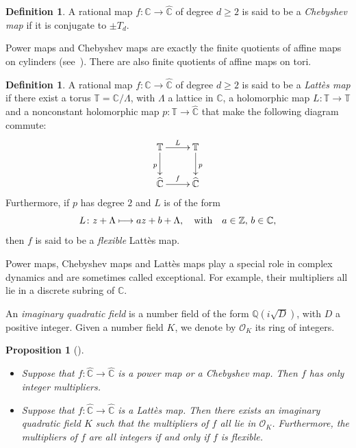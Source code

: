 \documentclass[11pt]{article}
\newcommand{\skpt}{\smallskip}
\newcommand\mto{\mathchoice{\longmapsto}{\mapsto}{\mapsto}{\mapsto}}
\theoremstyle{plain}
\newtheorem{proposition}[theorem]{Proposition}
\theoremstyle{definition}
\newtheorem{definition}[theorem]{Definition}
\theoremstyle{remark}
\begin{document}
\begin{definition}
A rational map $f \colon \widehat{\mathbb{C}} \to \widehat{\mathbb{C}}$ of degree $d \geq 2$ is said to be a \emph{Chebyshev map} if it is conjugate to $\pm T_{d}$.
\end{definition}

Power maps and Chebyshev maps are exactly the finite quotients of affine maps on cylinders (see~\cite[Lem.\,3.8]{M2006}). There are also finite quotients of affine maps on tori.

\begin{definition}
A rational map $f \colon \widehat{\mathbb{C}} \to \widehat{\mathbb{C}}$ of degree $d \geq 2$ is said to be a \emph{Lattès map} if there exist a torus $\mathbb{T} = \mathbb{C}/\Lambda$, with $\Lambda$ a lattice in $\mathbb{C}$, a holomorphic map $L \colon \mathbb{T} \to \mathbb{T}$ and a nonconstant holomorphic map $p \colon \mathbb{T} \to \widehat{\mathbb{C}}$ that make the following diagram commute:
\[
\xymatrix{
\mathbb{T}\ar[r]^-L\ar[d]_p&\mathbb{T}\ar[d]^p\\
\widehat{\mathbb{C}}\ar[r]^-f&\widehat{\mathbb{C}}
}
\]
Furthermore, if $p$ has degree $2$ and $L$ is of the form
\[
L \colon z +\Lambda \mto a z +b +\Lambda, \quad \text{with} \quad a \in \mathbb{Z}, \, b \in \mathbb{C},
\]
then $f$ is said to be a \emph{flexible} Lattès map.
\end{definition}

Power maps, Chebyshev maps and Lattès maps play a special role in complex dynamics and are sometimes called exceptional. For example, their multipliers all lie in a discrete subring of $\mathbb{C}$.

An \emph{imaginary quadratic field} is a number field of the form $\mathbb{Q}(i \sqrt{D})$, with $D$ a positive integer. Given a number field $K$, we denote by $\mathcal{O}_{K}$ its ring of integers.

\skpt
\begin{proposition}[{\cite[Cor.\,3.9 \& Lem.\,5.6]{M2006}}]
\label{proposition:special}
\begin{itemize}
\item Suppose that $f \colon \widehat{\mathbb{C}} \to \widehat{\mathbb{C}}$ is a power map or a Chebyshev map. Then $f$ has only integer multipliers.
\item Suppose that $f \colon \widehat{\mathbb{C}} \to \widehat{\mathbb{C}}$ is a Lattès map. Then there exists an imaginary quadratic field $K$ such that the multipliers of $f$ all lie in $\mathcal{O}_{K}$. Furthermore, the multipliers of $f$ are all integers if and only if $f$ is flexible.
\end{itemize}
\end{proposition}
\end{document}
